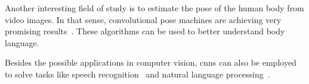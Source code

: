 Another interesting field of study is to estimate the pose of the human body from video images. In that sense, convolutional pose machines are achieving very promising results~\cite{DBLP:journals/corr/WeiRKS16}. These algorithms can be used to better understand body language.

Besides the possible applications in computer vision, \glspl{cnn} can also be employed to solve tasks like speech recognition~\cite{conf/icassp/Abdel-HamidMJP12} and natural language processing~\cite{DBLP:journals/corr/LopezK17}.